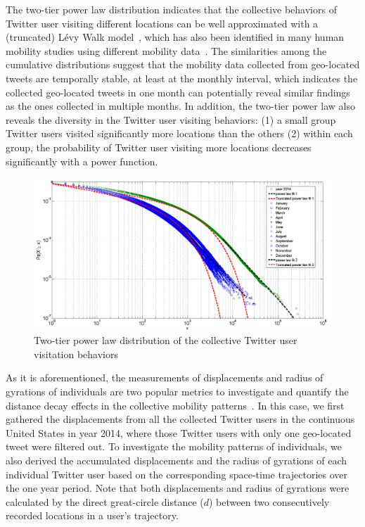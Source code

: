 \documentclass[ijgi,article,submit,moreauthors,pdftex,10pt,a4paper]{mdpi}
\theoremstyle{mdpi}
\newcounter{ex}
\newcounter{re}
\theoremstyle{mdpidefinition}
\begin{document}
The two-tier power law distribution indicates that the collective behaviors of Twitter user visiting different locations can be well approximated with a (truncated) L\'{e}vy Walk model~\cite{ reynolds2012truncated, rhee2011levy}, which has also been identified in many human mobility studies using different mobility data~\cite{zhao2015explaining}.
The similarities among the cumulative distributions suggest that the mobility data collected from geo-located tweets are temporally stable, at least at the monthly interval, which indicates the collected geo-located tweets in one month can potentially reveal similar findings as the ones collected in multiple months.
In addition, the two-tier power law also reveals the diversity in the Twitter user visiting behaviors: (1) a small group Twitter users visited significantly more locations than the others (2) within each group, the probability of Twitter user visiting more locations decreases significantly with a power function.

\begin{figure}[ht]
\centering
\includegraphics[width=1.0\linewidth]{./figures/visitation}
\caption{Two-tier power law distribution of the collective Twitter user visitation behaviors}
\label{fig:visitation}
\end{figure}
\FloatBarrier

As it is aforementioned, the measurements of displacements and radius of gyrations of individuals are two popular metrics to investigate and quantify the distance decay effects in the collective mobility patterns~\cite{gonzalez2008understanding}.
In this case, we first gathered the displacements from all the collected Twitter users in the continuous United States in year 2014, where those Twitter users with only one geo-located tweet were filtered out. 
To investigate the mobility patterns of individuals, we also derived the accumulated displacements and the radius of gyrations of each individual Twitter user based on the corresponding space-time trajectories over the one year period.
Note that both displacements and radius of gyrations were calculated by the direct great-circle distance ($d$) between two consecutively recorded locations in a user's trajectory.
\end{document}

